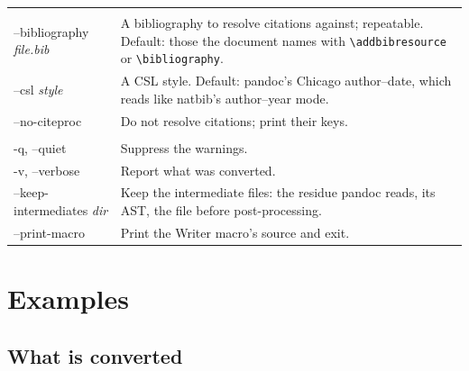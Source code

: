 \documentclass[11pt,a4paper]{article}
\newcommand{\cs}[1]{\texttt{\textbackslash #1}}
\newcommand{\meta}[1]{\textrm{\itshape\textlangle#1\textrangle}}
\begin{document}
\begin{longtable}{@{}>{\ttfamily}p{4.1cm} p{9.5cm}@{}}
\multicolumn{2}{@{}l}{\emph{Citations}}\\[2pt]
--bibliography \meta{file.bib} & A bibliography to resolve citations
  against; repeatable. Default: those the document names with
  \cs{addbibresource} or \cs{bibliography}.\\
--csl \meta{style} & A CSL style. Default: pandoc's Chicago author--date,
  which reads like natbib's author--year mode.\\
--no-citeproc & Do not resolve citations; print their keys.\\[4pt]
\multicolumn{2}{@{}l}{\emph{Diagnostics}}\\[2pt]
-q, --quiet & Suppress the warnings.\\
-v, --verbose & Report what was converted.\\
--keep-intermediates \meta{dir} & Keep the intermediate files: the
  residue pandoc reads, its AST, the file before post-processing.\\
--print-macro & Print the Writer macro's source and exit.\\
\bottomrule
\end{longtable}

\section{Examples}\label{sec:examples}

\subsection{What is converted}
\end{document}
